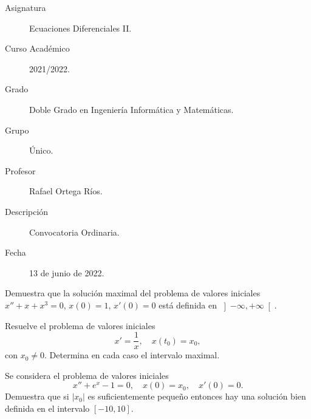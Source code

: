 \documentclass[12pt]{article}
\begin{document}

    
    

    \begin{description}
        \item[Asignatura] Ecuaciones Diferenciales II.
        \item[Curso Académico] 2021/2022.
        \item[Grado] Doble Grado en Ingeniería Informática y Matemáticas.
        \item[Grupo] Único.
        \item[Profesor] Rafael Ortega Ríos.
        \item[Descripción] Convocatoria Ordinaria.
        \item[Fecha] 13 de junio de 2022.
    
    \end{description}
    \newpage


    
    \begin{ejercicio}
        Demuestra que la solución maximal del problema de valores iniciales $x'' + x + x^3 = 0$, $x(0) = 1$, $x'(0) = 0$ está definida en $\left]-\infty, +\infty\right[$.
    \end{ejercicio}

    \begin{ejercicio}
        Resuelve el problema de valores iniciales
        \[
        x' = \frac{1}{x}, \quad x(t_0) = x_0,
        \]
        con $x_0 \neq 0$. Determina en cada caso el intervalo maximal.
    \end{ejercicio}

    \begin{ejercicio}
        Se considera el problema de valores iniciales
        \[
        x'' + e^x - 1 = 0, \quad x(0) = x_0, \quad x'(0) = 0.
        \]
        Demuestra que si $|x_0|$ es suficientemente pequeño entonces hay una solución bien definida en el intervalo $\left[-10, 10\right]$.
    \end{ejercicio}
\end{document}

